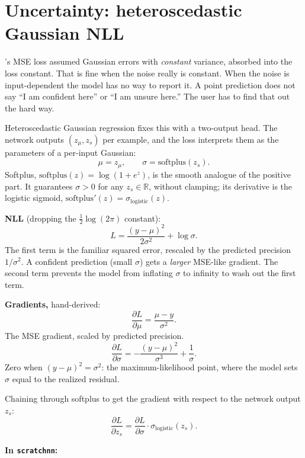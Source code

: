 
\section{Uncertainty: heteroscedastic Gaussian NLL}\label{sec:heteroscedastic}

's MSE loss assumed Gaussian errors with
\emph{constant} variance, absorbed into the loss constant. That is fine
when the noise really is constant. When the noise is input-dependent the
model has no way to report it. A point prediction does not say ``I am
confident here'' or ``I am unsure here.'' The user has to find that out
the hard way.

Heteroscedastic Gaussian regression fixes this with a two-output head.
The network outputs $(z_\mu, z_s)$ per example, and the loss interprets
them as the parameters of a per-input Gaussian:
\[
  \mu = z_\mu, \qquad \sigma = \mathrm{softplus}(z_s).
\]
Softplus, $\mathrm{softplus}(z) = \log(1 + e^z)$, is the smooth
analogue of the positive part. It guarantees $\sigma > 0$ for any
$z_s \in \mathbb{R}$, without clamping; its derivative is the logistic
sigmoid, $\mathrm{softplus}'(z) = \sigma_{\mathrm{logistic}}(z)$.

\textbf{NLL} (dropping the $\tfrac{1}{2}\log(2\pi)$ constant):
\[
  L = \frac{(y - \mu)^2}{2\sigma^2} + \log \sigma.
\]
The first term is the familiar squared error, rescaled by the predicted
precision $1/\sigma^2$. A confident prediction (small $\sigma$) gets a
\emph{larger} MSE-like gradient. The second term prevents the model from
inflating $\sigma$ to infinity to wash out the first term.

\textbf{Gradients,} hand-derived:
\[
  \frac{\partial L}{\partial \mu} = \frac{\mu - y}{\sigma^2}.
\]
The MSE gradient, scaled by predicted precision.
\[
  \frac{\partial L}{\partial \sigma} = -\frac{(y - \mu)^2}{\sigma^3} + \frac{1}{\sigma}.
\]
Zero when $(y - \mu)^2 = \sigma^2$: the maximum-likelihood point, where
the model sets $\sigma$ equal to the realized residual.

Chaining through softplus to get the gradient with respect to the
network output $z_s$:
\[
  \frac{\partial L}{\partial z_s}
    = \frac{\partial L}{\partial \sigma} \cdot \sigma_{\mathrm{logistic}}(z_s).
\]

\textbf{In \texttt{scratchnn}:}

